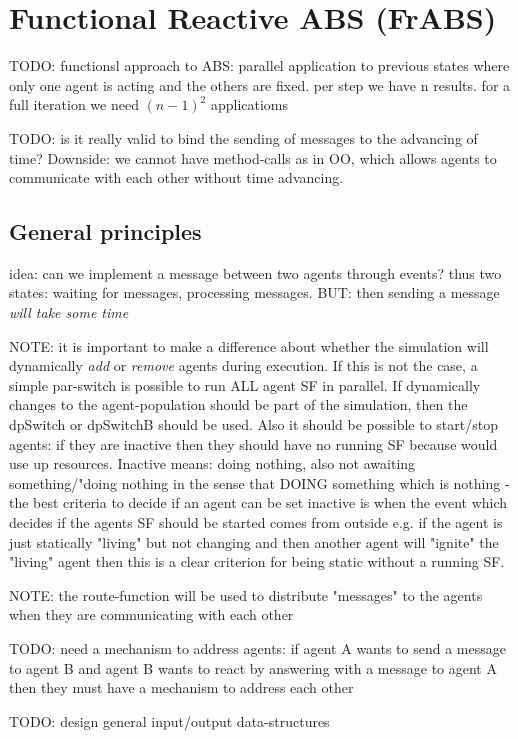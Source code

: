 \chapter{Functional Reactive ABS (FrABS)}
\label{chap:frABS}

TODO: functionsl approach to ABS: parallel application to previous states where only one agent is acting and the others are fixed. per step we have n results. for a full iteration we need $(n-1)^2$ applicatioms


TODO: is it really valid to bind the sending of messages to the advancing of time?
Downside: we cannot have method-calls as in OO, which allows agents to communicate with each other without time advancing. 


\section{General principles}
idea: can we implement a message between two agents through events? thus two states: waiting for messages, processing messages. BUT: then sending a message \textit{will take some time}

NOTE: it is important to make a difference about whether the simulation will dynamically \textit{add} or \textit{remove} agents during execution. If this is not the case, a simple par-switch is possible to run ALL agent SF in parallel. If dynamically changes to the agent-population should be part of the simulation, then the dpSwitch or dpSwitchB should be used. Also it should be possible to start/stop agents: if they are inactive then they should have no running SF because would use up resources. Inactive means: doing nothing, also not awaiting something/"doing nothing in the sense that DOING something which is nothing - the best criteria to decide if an agent can be set inactive is when the event which decides if the agents SF should be started comes from outside e.g. if the agent is just statically "living" but not changing and then another agent will "ignite" the "living" agent then this is a clear criterion for being static without a running SF.

NOTE: the route-function will be used to distribute "messages" to the agents when they are communicating with each other 

TODO: need a mechanism to address agents: if agent A wants to send a message to agent B and agent B wants to react by answering with a message to agent A then they must have a mechanism to address each other 

TODO: design general input/output data-structures 

